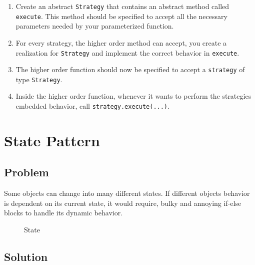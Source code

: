 \begin{enumerate}
\def\labelenumi{\arabic{enumi}.}
\tightlist
\item
  Create an abstract \texttt{Strategy} that contains an abstract method
  called \texttt{execute}. This method should be specified to accept all
  the necessary parameters needed by your parameterized function.
\item
  For every strategy, the higher order method can accept, you create a
  realization for \texttt{Strategy} and implement the correct behavior
  in \texttt{execute}.
\item
  The higher order function should now be specified to accept a
  \texttt{strategy} of type \texttt{Strategy}.
\item
  Inside the higher order function, whenever it wants to perform the
  strategies embedded behavior, call \texttt{strategy.execute(...)}.
\end{enumerate}

\section{State Pattern}\label{behavioral-patterns.md__state-pattern}

\subsection{Problem}\label{behavioral-patterns.md__problem-1}

Some objects can change into many different states. If different objects
behavior is dependent on its current state, it would require, bulky and
annoying if-else blocks to handle its dynamic behavior.

\begin{figure}
\centering
{}
\caption{State}
\end{figure}

\subsection{Solution}\label{behavioral-patterns.md__solution-1}

